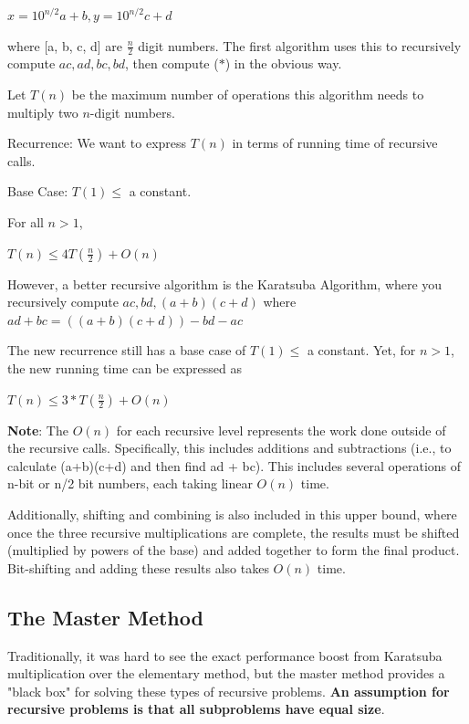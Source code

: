 \documentclass[11pt]{article}
\newenvironment{aside}
  {\begin{mdframed}[style=0,%
      leftline=false,rightline=false,leftmargin=2em,rightmargin=2em,%
          innerleftmargin=0pt,innerrightmargin=0pt,linewidth=0.75pt,%
      skipabove=7pt,skipbelow=7pt]\small}
  {\end{mdframed}}
\newcommand{\myeq}[1]{
    \vspace{11pt}
    \begin{center}
        ${#1}$
    \end{center}
    \vspace{11pt}
}
\begin{document}
\myeq{x=10^{n/2}a+b, y=10^{n/2}c+d}

where [a, b, c, d] are $\frac{n}{2}$ digit numbers. The first algorithm uses this to recursively compute $ac,ad,bc,bd$, then compute ($*$) in the obvious way.

Let $T(n)$ be the maximum number of operations this algorithm needs to multiply two $n$-digit numbers.

Recurrence: We want to express $T(n)$ in terms of running time of recursive calls.

Base Case: $T(1)\leq$ a constant.

For all $n > 1$,

\myeq{T(n) \leq 4T(\frac{n}{2})+O(n)}

However, a better recursive algorithm is the Karatsuba Algorithm, where you recursively compute $ac,bd,(a+b)(c+d)$ where $ad+bc=((a+b)(c+d))-bd-ac$

The new recurrence still has a base case of $T(1) \leq $ a constant. Yet, for $n > 1$, the new running time can be expressed as

\myeq{T(n) \leq 3*T(\frac{n}{2})+O(n)}

\begin{aside}
\textbf{Note}: The $O(n)$ for each recursive level represents the work done outside of the recursive calls. Specifically, this includes additions and subtractions (i.e., to calculate (a+b)(c+d) and then find ad + bc). This includes several operations of n-bit or n/2 bit numbers, each taking linear $O(n)$ time.

Additionally, shifting and combining is also included in this upper bound, where once the three recursive multiplications are complete, the results must be shifted (multiplied by powers of the base) and added together to form the final product. Bit-shifting and adding these results also takes $O(n)$ time.
\end{aside}

\vspace{11pt}
\subsection{The Master Method}
\vspace{11pt}

Traditionally, it was hard to see the exact performance boost from Karatsuba multiplication over the elementary method, but the master method provides a "black box" for solving these types of recursive problems. \textbf{An assumption for recursive problems is that all subproblems have equal size}.
\end{document}
